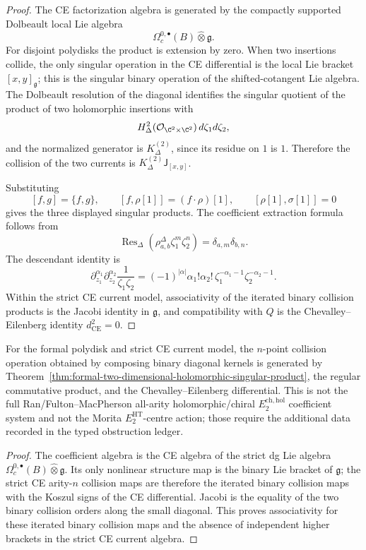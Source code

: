 \begin{proof}
The CE factorization algebra is generated by the compactly supported
Dolbeault local Lie algebra
\[
  \Omega_c^{0,\bullet}(B)\widehat\otimes\mathfrak g .
\]
For disjoint polydisks the product is extension by zero.  When two
insertions collide, the only singular operation in the CE differential
is the local Lie bracket
\([x,y]_{\mathfrak g}\); this is the singular binary operation of
the shifted-cotangent Lie algebra.  The Dolbeault resolution of the
diagonal identifies the singular quotient of the product of two
holomorphic insertions with
\[
  H^2_\Delta(\mathcal O_{\C^2\times\C^2})\,d\zeta_1d\zeta_2,
\]
and the normalized generator is \(K^{(2)}_\Delta\), since its residue on
\(1\) is \(1\).  Therefore the collision of the two currents is
\(K^{(2)}_\Delta\mathsf{J}_{[x,y]}\).

Substituting
\[
  [f,g]=\{f,g\},\qquad
  [f,\rho[1]]=(f\cdot\rho)[1],\qquad
  [\rho[1],\sigma[1]]=0
\]
gives the three displayed singular products.  The coefficient extraction formula
follows from
\[
  \operatorname{Res}_\Delta(\rho^\Delta_{a,b}\zeta_1^m\zeta_2^n)
  =
  \delta_{a,m}\delta_{b,n}.
\]
The descendant identity is
\[
  \partial_{z_1}^{\alpha_1}\partial_{z_2}^{\alpha_2}
  \frac{1}{\zeta_1\zeta_2}
  =
  (-1)^{|\alpha|}\alpha_1!\alpha_2!\,
  \zeta_1^{-\alpha_1-1}\zeta_2^{-\alpha_2-1}.
\]
Within the strict CE current model, associativity of the iterated
binary collision products is the Jacobi identity in \(\mathfrak g\),
and compatibility with \(Q\) is the Chevalley--Eilenberg identity
\(d_{\mathrm{CE}}^2=0\).
\end{proof}

\begin{cor}
\label{cor:binary-generation-higher-two-dimensional-singular-product}
For the formal polydisk and strict CE current model, the \(n\)-point
collision operation obtained by composing binary diagonal kernels is
generated by
Theorem~\ref{thm:formal-two-dimensional-holomorphic-singular-product}, the regular
commutative product, and the Chevalley--Eilenberg differential.  This is
not the full Ran/Fulton--MacPherson all-arity holomorphic/chiral
\(E_2^{\mathrm{ch,hol}}\) coefficient system and not the Morita
\(E_2^{\mathrm{HT}}\)-centre action; those require the additional data
recorded in the typed obstruction ledger.
\end{cor}

\begin{proof}
The coefficient algebra is the CE algebra of the strict dg Lie algebra
\(\Omega_c^{0,\bullet}(B)\widehat\otimes\mathfrak g\).  Its only
nonlinear structure map is the binary Lie bracket of \(\mathfrak g\);
the strict CE arity-\(n\) collision maps are therefore the iterated binary
collision maps with the Koszul signs of the CE differential.  Jacobi is
the equality of the two binary collision orders along the small
diagonal.  This proves associativity for these iterated binary collision
maps and the absence of independent higher brackets in the strict CE
current algebra.
\end{proof}

